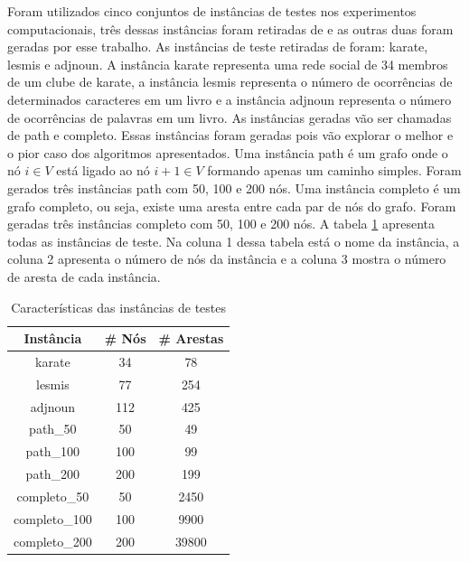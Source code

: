 Foram utilizados cinco conjuntos de instâncias de testes nos experimentos computacionais, três dessas instâncias foram retiradas de \cite{files_test} e as outras duas foram geradas por esse trabalho. As instâncias de teste retiradas de \cite{files_test}
foram: karate, lesmis e adjnoun. A instância karate representa uma rede social de 34 membros de um clube de karate, a instância
lesmis representa o número de ocorrências de determinados caracteres em um livro e a instância adjnoun representa
o número de ocorrências de palavras em um livro. As instâncias geradas vão ser chamadas de path e completo. Essas instâncias
foram geradas pois vão explorar o melhor e o pior caso dos algoritmos apresentados. Uma instância
path é um grafo onde o nó $i \in V$ está ligado ao nó $i+1 \in V$ formando apenas um caminho simples. Foram gerados três 
instâncias path com 50, 100 e 200 nós.  Uma instância completo é um grafo completo, ou seja, existe uma aresta
entre cada par de nós do grafo. Foram geradas três instâncias completo com 50, 100 e 200 nós.
A tabela \ref{table:instancias} apresenta todas as instâncias de teste. Na coluna 1 dessa tabela está o nome da instância,
a coluna 2 apresenta o número de nós da instância e a coluna 3 mostra o número de aresta de cada instância.

\begin{table}[htbp]
\begin{center}
  \begin{tabular}{|c|c|c|}
    \hline
      Instância                & \# Nós                   & \# Arestas \\ \hline
      karate                   & 34                       & 78 \\ \hline
      lesmis                   & 77                       & 254 \\ \hline
      adjnoun                  & 112                      & 425 \\ \hline
      path\_50                 & 50                       & 49 \\ \hline
      path\_100                & 100                      & 99 \\ \hline
      path\_200                & 200                      & 199 \\ \hline
      completo\_50             & 50                       & 2450 \\ \hline
      completo\_100            & 100                      & 9900 \\ \hline
      completo\_200            & 200                      & 39800 \\ \hline
  \end{tabular}
\caption{Características das instâncias de testes}
\label{table:instancias}
\end{center}
\end{table}

